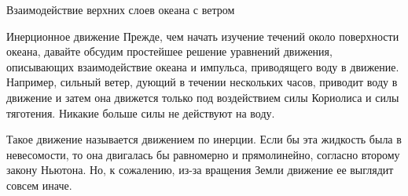 \begin{chapter}{Взаимодействие верхних слоев океана с ветром}
\begin{section}{Инерционное движение}
Прежде, чем начать изучение течений около поверхности океана, давайте
обсудим простейшее решение уравнений движения, описывающих
взаимодействие океана и импульса, приводящего воду в
движение. Например, сильный ветер, дующий в течении нескольких часов,
приводит воду в движение и затем она движется только под воздействием
силы Кориолиса и силы тяготения. Никакие больше силы не действуют на
воду.
%

Такое движение называется движением по инерции. Если бы эта жидкость
была в невесомости, то она двигалась бы равномерно и прямолинейно,
согласно второму закону Ньютона. Но, к сожалению, из-за вращения Земли
движение ее выглядит совсем иначе.
%


\end{section}
\end{chapter}
